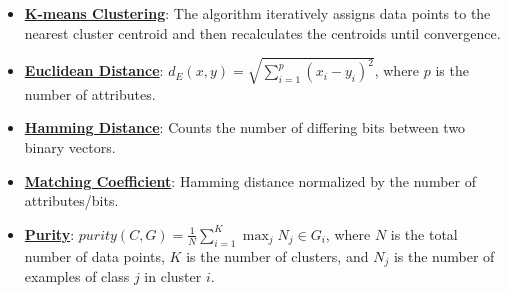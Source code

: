 \documentclass{article}%
\begin{document}
\begin{itemize}[leftmargin=*]%
\item \href{https://purdue.brightspace.com/d2l/common/assets/pdfjs-d2l-dist/1.0.14-legacy/web/viewer.html?file=\%2Fcontent\%2Fenforced\%2F1095467-wl.202510.CS.24300.001\%2F12L2-distance-clusters.pdf\%3Fou\%3D1095467\&lang=en-us\&container=d2l-fileviewer-rendered-pdf\&fullscreen=d2l-fileviewer-rendered-pdf-dialog\&height=667#page=22}{\textbf{K{-}means Clustering}}: The algorithm iteratively assigns data points to the nearest cluster centroid and then recalculates the centroids until convergence.%
\item \href{https://purdue.brightspace.com/d2l/common/assets/pdfjs-d2l-dist/1.0.14-legacy/web/viewer.html?file=\%2Fcontent\%2Fenforced\%2F1095467-wl.202510.CS.24300.001\%2F12L2-distance-clusters.pdf\%3Fou\%3D1095467\&lang=en-us\&container=d2l-fileviewer-rendered-pdf\&fullscreen=d2l-fileviewer-rendered-pdf-dialog\&height=667#page=17}{\textbf{Euclidean Distance}}: $d_E(x, y) = \sqrt{\sum_{i=1}^{p} (x_i - y_i)^2}$, where $p$ is the number of attributes.%
\item \href{https://purdue.brightspace.com/d2l/common/assets/pdfjs-d2l-dist/1.0.14-legacy/web/viewer.html?file=\%2Fcontent\%2Fenforced\%2F1095467-wl.202510.CS.24300.001\%2F12L2-distance-clusters.pdf\%3Fou\%3D1095467\&lang=en-us\&container=d2l-fileviewer-rendered-pdf\&fullscreen=d2l-fileviewer-rendered-pdf-dialog\&height=667#page=19}{\textbf{Hamming Distance}}: Counts the number of differing bits between two binary vectors.%
\item \href{https://purdue.brightspace.com/d2l/common/assets/pdfjs-d2l-dist/1.0.14-legacy/web/viewer.html?file=\%2Fcontent\%2Fenforced\%2F1095467-wl.202510.CS.24300.001\%2F12L2-distance-clusters.pdf\%3Fou\%3D1095467\&lang=en-us\&container=d2l-fileviewer-rendered-pdf\&fullscreen=d2l-fileviewer-rendered-pdf-dialog\&height=667#page=19}{\textbf{Matching Coefficient}}: Hamming distance normalized by the number of attributes/bits.%
\item \href{https://purdue.brightspace.com/d2l/common/assets/pdfjs-d2l-dist/1.0.14-legacy/web/viewer.html?file=\%2Fcontent\%2Fenforced\%2F1095467-wl.202510.CS.24300.001\%2F12L2-distance-clusters.pdf\%3Fou\%3D1095467\&lang=en-us\&container=d2l-fileviewer-rendered-pdf\&fullscreen=d2l-fileviewer-rendered-pdf-dialog\&height=667#page=44}{\textbf{Purity}}: $purity(C, G) = \frac{1}{N} \sum_{i=1}^{K} \max_{j} N_j \in G_i$, where $N$ is the total number of data points, $K$ is the number of clusters, and $N_j$ is the number of examples of class $j$ in cluster $i$.%
\end{itemize}%
\end{document}
